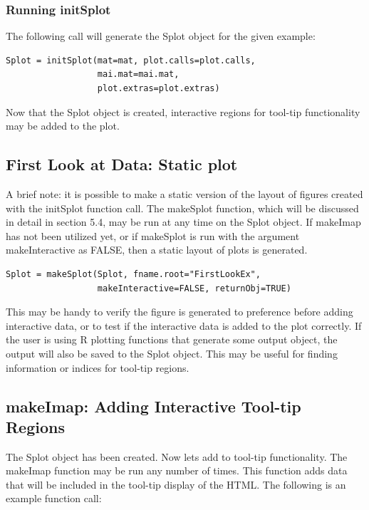 \documentclass[]{article}
\begin{document}
\subsubsection{Running initSplot}

\indent The following call will generate the Splot object for the given example:

\begin{verbatim}
Splot = initSplot(mat=mat, plot.calls=plot.calls,
                  mai.mat=mai.mat, 
                  plot.extras=plot.extras)
\end{verbatim}



\indent Now that the Splot object is created, interactive regions for tool-tip functionality may be added to the plot. 
\subsection{First Look at Data: Static plot}

\indent A brief note: it is possible to make a static version of the layout of figures created with the initSplot function call. The makeSplot function, which will be discussed in detail in section 5.4, may be run at any time on the Splot object. If makeImap has not been utilized yet, or if makeSplot is run with the argument makeInteractive as FALSE,  then a static layout of plots is generated.

\begin{verbatim}
Splot = makeSplot(Splot, fname.root="FirstLookEx", 
                  makeInteractive=FALSE, returnObj=TRUE)

\end{verbatim}


\indent This may be handy to verify the figure is generated to preference before adding interactive data, or to test if the interactive data is added to the plot correctly. If the user is using R plotting functions that generate some output object, the output will also be saved to the Splot object. This may be useful for finding information or indices for tool-tip regions.  

\subsection{makeImap: Adding Interactive Tool-tip Regions}

\indent The Splot object has been created. Now lets add to tool-tip functionality. The makeImap function may be run any number of times. This function adds data that will be included in the tool-tip display of the HTML. The following is an example function call:
\end{document}
